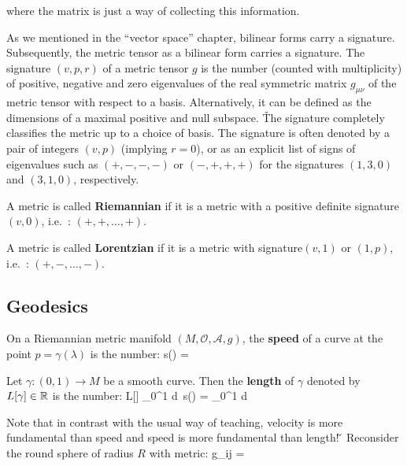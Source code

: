where the matrix is just a way of collecting this information.
\ee

As we mentioned in the ``vector space'' chapter, bilinear forms carry a signature. Subsequently, the metric tensor as
a bilinear form carries a signature. The signature $(v, p, r)$ of a metric tensor $g$ is the number (counted with
multiplicity) of positive, negative and zero eigenvalues of the real symmetric matrix $g_{\mu \nu}$ of the metric
tensor with respect to a basis. Alternatively, it can be defined as the dimensions of a maximal positive and null
subspace. \v

The signature completely classifies the metric up to a choice of basis. The signature is often denoted by a pair of
integers $(v, p)$ (implying $r=0$), or as an explicit list of signs of eigenvalues such as $(+, -, -, -)$ or $(-, +,
+, +)$ for the signatures $(1, 3, 0)$ and $(3, 1, 0)$, respectively.

A metric is called \textbf{Riemannian} if it is a metric with a positive definite signature $(v, 0)$, i.e.\ :
$(+,+, \dots,+)$.
\ed

A metric is called \textbf{Lorentzian} if it is a metric with signature$(v,1)$ or $(1, p)$, i.e.\ : $(+, -, \dots, -)$.
\ed

\subsection{Geodesics}

On a Riemannian metric manifold $(M, \mathcal{O}, \mathscr{A}, g)$, the \textbf{speed} of a curve at the point $p=
\gamma(\lambda)$ is the number:
\bse
s(\lambda) = 
\ese
\ed

Let $\gamma:(0,1) \to M$ be a smooth curve. Then the \textbf{length} of $\gamma$ denoted by $L[\gamma] \in \mathbb{R}$ is the
number:
\bse
L[\gamma] \coloneqq \int_0^1 d\lambda \, s(\lambda) = \int_0^1 d\lambda {}
\ese
\ed

Note that in contrast with the usual way of teaching, velocity is more fundamental than speed and speed is more
fundamental than length! \v

\be
Reconsider the round sphere of radius $R$ with metric:
\bse
g_{ij} = 
\ese

